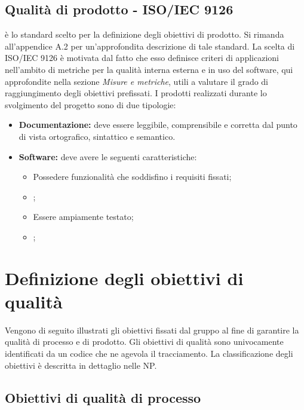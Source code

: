 \documentclass[openany,12pt,a4paper]{report}
\begin{document}
    \subsection{Qualità di prodotto - ISO/IEC 9126}
    
     è lo standard scelto per la definizione degli obiettivi di prodotto. Si rimanda all'appendice A.2 per un'approfondita descrizione di tale standard.
    La scelta di ISO/IEC 9126 è motivata dal fatto che esso definisce criteri di applicazioni nell'ambito di metriche per la qualità interna esterna e in uso del software, qui approfondite nella sezione \textit{Misure e metriche}, utili a valutare il grado di raggiungimento degli obiettivi prefissati.
    I prodotti realizzati durante lo svolgimento del progetto sono di due tipologie:
    
    \begin{itemize}
    	\item \textbf{Documentazione:} deve essere leggibile, comprensibile e corretta dal punto di vista ortografico, sintattico e semantico.
    	
    	\item \textbf{Software:} deve avere le seguenti caratteristiche:
    	\begin{itemize}
    		\item Possedere funzionalità che soddisfino i requisiti fissati;
    		\item {};
    		\item Essere ampiamente testato;
    		\item {};
    	\end{itemize}
    \end{itemize}
    
    
    \section{Definizione degli obiettivi di qualità}    
    
    Vengono di seguito illustrati gli obiettivi fissati dal gruppo al fine di garantire la qualità di processo e di prodotto. Gli obiettivi di qualità sono univocamente identificati da un codice che ne agevola il tracciamento. La classificazione degli obiettivi è descritta in dettaglio nelle NP.
    
    \subsection{Obiettivi di qualità di processo}
    
\end{document}
